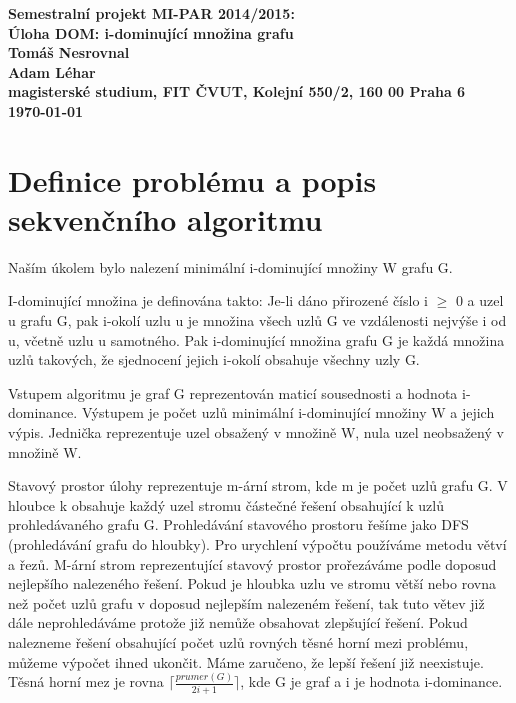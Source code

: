 \documentclass[12pt]{article}
\begin{document}

\begin{center}
\bf Semestralní projekt MI-PAR 2014/2015:\\[5mm]
    Úloha DOM: i-dominující množina grafu\\[5mm]
       Tomáš Nesrovnal\\
       Adam Léhar\\[2mm]
magisterské studium, FIT ČVUT, Kolejní 550/2, 160 00 Praha 6\\[2mm]
\today
\end{center}

\section{Definice problému a popis sekvenčního algoritmu}
Naším úkolem bylo nalezení minimální i-dominující množiny W grafu G.

I-dominující množina je definována takto: Je-li dáno přirozené číslo i $\geq$ 0 a uzel u grafu G, pak i-okolí uzlu u je množina všech uzlů G ve vzdálenosti nejvýše i od u, včetně uzlu u samotného. Pak i-dominující množina grafu G je každá množina uzlů takových, že sjednocení jejich i-okolí obsahuje všechny uzly G.

Vstupem algoritmu je graf G reprezentován maticí sousednosti a hodnota i-dominance. Výstupem je počet uzlů minimální i-dominující množiny W a jejich výpis. Jednička reprezentuje uzel obsažený v množině W, nula uzel neobsažený v množině W.

Stavový prostor úlohy reprezentuje m-ární strom, kde m je počet uzlů grafu G. V hloubce k obsahuje každý uzel stromu částečné řešení obsahující k uzlů prohledávaného grafu G. Prohledávání stavového prostoru řešíme jako DFS (prohledávání grafu do hloubky). Pro urychlení výpočtu používáme metodu větví a řezů. M-ární strom reprezentující stavový prostor prořezáváme podle doposud nejlepšího nalezeného řešení. Pokud je hloubka uzlu ve stromu větší nebo rovna než počet uzlů grafu v doposud nejlepším nalezeném řešení, tak tuto větev již dále neprohledáváme protože již nemůže obsahovat zlepšující řešení. Pokud nalezneme řešení obsahující počet uzlů rovných těsné horní mezi problému, můžeme výpočet ihned ukončit. Máme zaručeno, že lepší řešení již neexistuje. Těsná horní mez je rovna $\lceil\frac{prumer(G)}{2i+1}\rceil$, kde G je graf a i je hodnota i-dominance.
\end{document}

